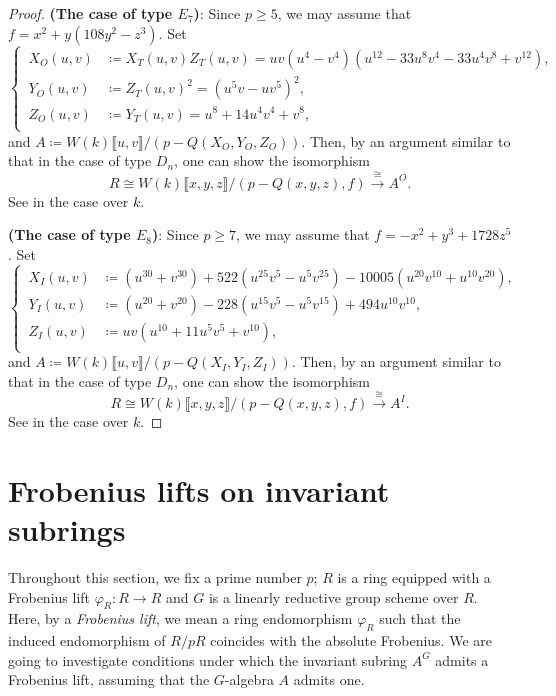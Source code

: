 \documentclass[uplatex,11pt,a4paper]{amsart} %
\numberwithin{equation}{section}
\numberwithin{figure}{section}
\numberwithin{table}{section}
\theoremstyle{plain}
\theoremstyle{definition}
\newcommand{\xr}{\xrightarrow}
\begin{document}
\begin{proof}
\textbf{(The case of type $E_7$)}: Since $p\geq 5$, we may assume that $f=x^2+y(108y^2-z^3)$. Set
\begin{equation*}
\left\{ \,
    \begin{aligned}
    X_O(u,v) &\coloneqq X_T(u,v)Z_T(u,v) = uv(u^4-v^4)(u^{12}-33u^8v^4-33u^4v^8+v^{12}), \\
    Y_O(u,v) &\coloneqq Z_T(u,v)^2 = (u^5v-uv^5)^2, \\
    Z_O(u,v) &\coloneqq Y_T(u,v) = u^8+14u^4v^4+v^8, \\
    \end{aligned}
\right.
\end{equation*}
and $A\coloneqq W(k)\llbracket u,v\rrbracket/(p-Q(X_O,Y_O,Z_O))$.
Then, by an argument similar to that in the case of type $D_n$, one can show the isomorphism
\[
R\cong W(k)\llbracket x,y,z\rrbracket/(p-Q(x,y,z),f) \xr{\cong} A^O.
\]
See \cite[6.16]{LW} in the case over $k$.

\textbf{(The case of type $E_8$)}: Since $p\geq 7$, we may assume that $f=-x^2+y^3+1728z^5$. Set
\begin{equation*}
\left\{ \,
    \begin{aligned}
    X_I(u,v) &\coloneqq (u^{30}+v^{30})+522(u^{25}v^5-u^5v^{25})-10005(u^{20}v^{10}+u^{10}v^{20}), \\
    Y_I(u,v) &\coloneqq (u^{20}+v^{20})-228(u^{15}v^5-u^5v^{15})+494u^{10}v^{10}, \\
    Z_I(u,v) &\coloneqq uv(u^{10}+11u^5v^5+v^{10}), \\
    \end{aligned}
\right.
\end{equation*}
and $A\coloneqq W(k)\llbracket u,v\rrbracket/(p-Q(X_I,Y_I,Z_I))$.
Then, by an argument similar to that in the case of type $D_n$, one can show the isomorphism
\[
R\cong W(k)\llbracket x,y,z\rrbracket/(p-Q(x,y,z),f) \xr{\cong} A^I.
\]
See \cite[6.17]{LW} in the case over $k$.
\end{proof}


\section{Frobenius lifts on invariant subrings}
\label{s:FrobG}

Throughout this section, we fix a prime number $p$; $R$ is a ring equipped with a Frobenius lift $\varphi_R\colon R\to R$ and $G$ is a linearly reductive group scheme over $R$. Here, by a \emph{Frobenius lift}, we mean a ring endomorphism $\varphi_R$ such that the induced endomorphism of $R/pR$ coincides with the absolute Frobenius. %
We are going to investigate conditions under which the invariant subring $A^G$ admits a Frobenius lift, assuming that the $G$-algebra $A$ admits one.
\end{document}
